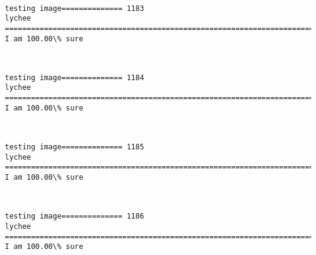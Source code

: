 \documentclass[11pt]{article}
\begin{document}
    \begin{center}
    \end{center}
    { \hspace*{\fill} \\}
    
    \begin{Verbatim}[commandchars=\\\{\}]
testing image============== 1183
lychee
============================================================================
I am 100.00\% sure

    \end{Verbatim}

    \begin{center}
    \end{center}
    { \hspace*{\fill} \\}
    
    \begin{Verbatim}[commandchars=\\\{\}]
testing image============== 1184
lychee
============================================================================
I am 100.00\% sure

    \end{Verbatim}

    \begin{center}
    \end{center}
    { \hspace*{\fill} \\}
    
    \begin{Verbatim}[commandchars=\\\{\}]
testing image============== 1185
lychee
============================================================================
I am 100.00\% sure

    \end{Verbatim}

    \begin{center}
    \end{center}
    { \hspace*{\fill} \\}
    
    \begin{Verbatim}[commandchars=\\\{\}]
testing image============== 1186
lychee
============================================================================
I am 100.00\% sure

    \end{Verbatim}
\end{document}
